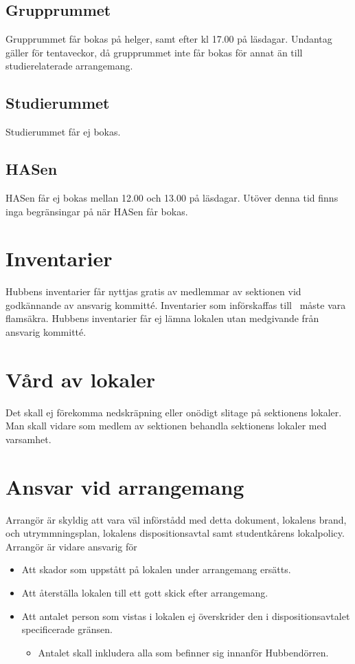 \documentclass[11pt, includeaddress]{classes/cthit}
\begin{document}
\subsection{Grupprummet}
Grupprummet får bokas på helger, samt efter kl 17.00 på läsdagar. Undantag gäller för tentaveckor, då
grupprummet inte får bokas för annat än till studierelaterade arrangemang.

\subsection{Studierummet}
Studierummet får ej bokas.

\subsection{HASen}
HASen får ej bokas mellan 12.00 och 13.00 på läsdagar. Utöver denna tid finns inga begränsingar på
när HASen får bokas.


\section{Inventarier}
Hubbens inventarier får nyttjas gratis av medlemmar av sektionen vid godkännande av ansvarig
kommitté. Inventarier som införskaffas till \HUBBEN\ måste vara flamsäkra.
Hubbens inventarier får ej lämna lokalen utan medgivande från ansvarig kommitté.

\section{Vård av lokaler}
Det skall ej förekomma nedskräpning eller onödigt slitage på sektionens lokaler.
Man skall vidare som medlem av sektionen behandla sektionens lokaler med varsamhet.

\section{Ansvar vid arrangemang}
Arrangör är skyldig att vara väl införstådd med detta dokument, lokalens brand­, och
utrymmningsplan, lokalens dispositionsavtal samt studentkårens lokalpolicy.
Arrangör är vidare ansvarig för
\begin{itemize}
	\item Att skador som uppstått på lokalen under arrangemang ersätts.
	\item Att återställa lokalen till ett gott skick efter arrangemang.
	\item Att antalet person som vistas i lokalen ej överskrider den i dispositionsavtalet specificerade
	gränsen.
	\begin{itemize}
	\item Antalet skall inkludera alla som befinner sig innanför Hubben­dörren.
	\end{itemize}
\end{itemize}
\end{document}
